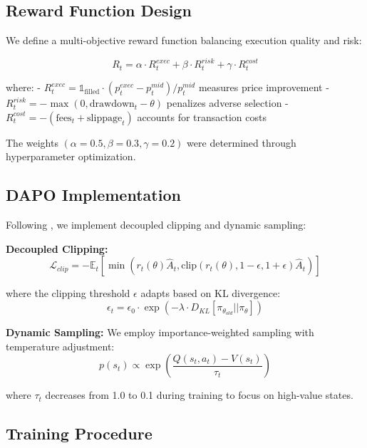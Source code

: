 \documentclass{report}
\begin{document}
\subsection{Reward Function Design}

We define a multi-objective reward function balancing execution quality and risk:

\begin{equation}
R_t = \alpha \cdot R^{exec}_t + \beta \cdot R^{risk}_t + \gamma \cdot R^{cost}_t
\end{equation}

where:
- $R^{exec}_t = \mathbb{1}_{\text{filled}} \cdot (p^{exec}_t - p^{mid}_t) / p^{mid}_t$ measures price improvement
- $R^{risk}_t = -\max(0, \text{drawdown}_t - \theta)$ penalizes adverse selection
- $R^{cost}_t = -(\text{fees}_t + \text{slippage}_t)$ accounts for transaction costs

The weights $(\alpha=0.5, \beta=0.3, \gamma=0.2)$ were determined through hyperparameter optimization.

\subsection{DAPO Implementation}

Following \cite{DAPO2025}, we implement decoupled clipping and dynamic sampling:

\textbf{Decoupled Clipping:}
\begin{equation}
\mathcal{L}_{clip} = -\mathbb{E}_t \left[ \min\left( r_t(\theta) \hat{A}_t, \text{clip}(r_t(\theta), 1-\epsilon, 1+\epsilon) \hat{A}_t \right) \right]
\end{equation}

where the clipping threshold $\epsilon$ adapts based on KL divergence:
\begin{equation}
\epsilon_t = \epsilon_0 \cdot \exp\left(-\lambda \cdot D_{KL}[\pi_{\theta_{old}} || \pi_\theta]\right)
\end{equation}

\textbf{Dynamic Sampling:}
We employ importance-weighted sampling with temperature adjustment:
\begin{equation}
p(s_t) \propto \exp\left(\frac{Q(s_t, a_t) - V(s_t)}{\tau_t}\right)
\end{equation}

where $\tau_t$ decreases from 1.0 to 0.1 during training to focus on high-value states.

\subsection{Training Procedure}
\end{document}
